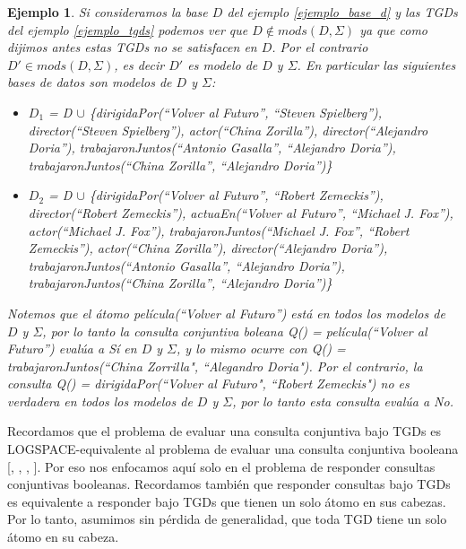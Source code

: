\documentclass[11pt,a4paper,twoside]{tesis}
\newtheorem{exmp}{Ejemplo}
\begin{document}
\begin{exmp} \label{ejemplo_responder_consultas_bajo_tgds}
Si consideramos la base $D$ del ejemplo \ref{ejemplo_base_d} y las TGDs del ejemplo \ref{ejemplo_tgds} podemos ver que $D \notin mods(D, \Sigma)$ ya que como dijimos antes estas TGDs no se satisfacen en $D$. Por el contrario  $D\prime \in mods(D, \Sigma)$, es decir $D\prime$ es modelo de $D$ y $\Sigma$. En particular las siguientes bases de datos son modelos de  $D$ y $\Sigma$:   

\begin{itemize}
    \item 
      \(D_1\) = D \(\cup\) \{\textit{dirigidaPor(``Volver al Futuro'', ``Steven Spielberg''), director(``Steven Spielberg''),
    actor(``China Zorilla''), director(``Alejandro Doria''), trabajaronJuntos(``Antonio Gasalla'', ``Alejandro Doria''), trabajaronJuntos(``China Zorilla'', ``Alejandro Doria'')}\}
    \item  \(D_2\) = D \(\cup\)  \{\textit{dirigidaPor(``Volver al Futuro'', ``Robert Zemeckis''), director(``Robert Zemeckis''), actuaEn(``Volver al Futuro'', ``Michael J. Fox''), actor(``Michael J. Fox''), trabajaronJuntos(``Michael J. Fox'', ``Robert Zemeckis''),  actor(``China Zorilla''), director(``Alejandro Doria''), trabajaronJuntos(``Antonio Gasalla'', ``Alejandro Doria''), trabajaronJuntos(``China Zorilla'', ``Alejandro Doria'')}\}

\end{itemize} 

Notemos que el átomo \textit{película(``Volver al Futuro'')} está en todos los \textit{modelos} de $D$ y $\Sigma$, por lo tanto la consulta conjuntiva boleana \textit{Q() = película(``Volver al Futuro'')} evalúa a \textit{Sí} en $D$ y $\Sigma$, y lo mismo ocurre con Q() = trabajaronJuntos(``China Zorrilla", ``Alegandro Doria"). Por el contrario, la consulta Q() = dirigidaPor(``Volver al Futuro", ``Robert Zemeckis") no es verdadera en todos los \textit{modelos} de $D$ y $\Sigma$, por lo tanto esta consulta evalúa a \textit{No}.
\end{exmp} 

Recordamos que el problema de evaluar una consulta conjuntiva bajo TGDs es LOGSPACE-equivalente al problema de evaluar una consulta conjuntiva booleana [\cite{Chandra}, \cite{Deutsch}, \cite{Fagin}, \cite{Johnson}]. Por eso nos enfocamos aquí solo en el problema de responder consultas conjuntivas booleanas. Recordamos también que responder consultas bajo TGDs es equivalente a responder bajo TGDs que tienen un solo átomo en sus cabezas. Por lo tanto, asumimos sin pérdida de generalidad, que toda TGD tiene un solo átomo en su cabeza.
\end{document}
